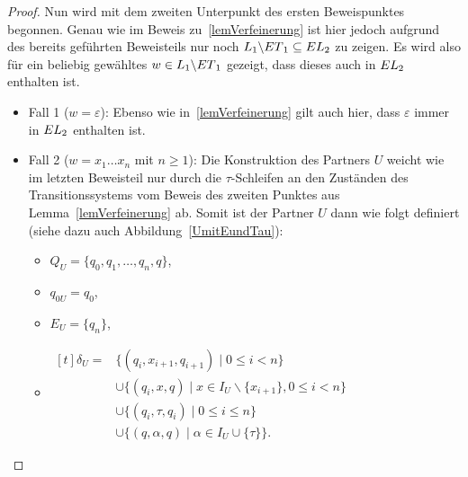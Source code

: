 \begin{proof}
  Nun wird mit dem zweiten Unterpunkt des ersten Beweispunktes begonnen. Genau
  wie im Beweis zu~\ref{lemVerfeinerung} ist hier jedoch aufgrund des bereits
  geführten Beweisteils nur noch $L_1\backslash ET{}_1\subseteq
  EL{}_2$ zu zeigen. Es wird also für ein beliebig gewähltes $w\in
  L_1\backslash ET{}_1$ gezeigt, dass dieses auch in $EL{}_2$ enthalten
  ist.
  \begin{itemize}
    \item Fall 1 ($w=\varepsilon$): Ebenso wie in~\ref{lemVerfeinerung} gilt
      auch hier, dass $\varepsilon$ immer in $EL{}_2$ enthalten ist.
    \item Fall 2 ($w=x_1\dots x_n$ mit $n\geq 1$): Die Konstruktion des
      Partners $U$ weicht wie im letzten Beweisteil nur durch die
      $\tau$-Schleifen an den Zuständen des Transitionssystems vom Beweis des
      zweiten Punktes aus
      Lemma~\ref{lemVerfeinerung} ab. Somit ist der Partner $U$ dann wie folgt
      definiert (siehe dazu auch Abbildung~\ref{UmitEundTau}):
      \begin{itemize}
        \item $Q_U=\{q_0,q_1,\dots ,q_n,q\}$,
        \item $q_{0U}=q_0$,
        \item $E_U=\{q_n\}$,
        \item $\begin{aligned}[t]
            \delta _U=&\{(q_i,x_{i+1},q_{i+1})\mid 0\leq i< n\}\\
                      &\cup\{(q_i,x,q)\mid x\in I_U\backslash\{x_{i+1}\},0\leq
          i < n\}\\
          &\cup\{(q_i,\tau ,q_i)\mid 0\leq i\leq n\}\\
          &\cup\{(q,\alpha ,q)\mid \alpha\in I_U\cup \{\tau\}\}.
              \end{aligned}$
      \end{itemize}
      \begin{figure} [h!tbp]
      \begin{center}
\end{center}
\end{figure}
\end{itemize}
\end{proof}
